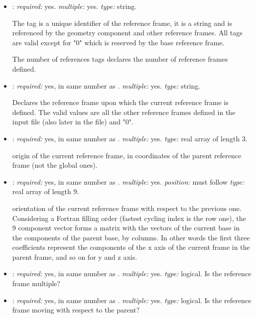 \begin{itemize}
\item {}: \textit{required:} yes. \textit{multiple:} yes. 
\textit{type:} string.

The tag is a unique identifier of the reference frame, it is a string and is 
referenced by the geometry component and other reference frames. All tags are 
valid except for "0" which is reserved by the base reference frame. 

The number of references tags declares the number of reference frames defined.

\item {}: \textit{required:} yes, in same number as . 
\textit{multiple:} yes. \textit{type:} string.

Declares the reference frame upon which the current reference frame is defined. 
The valid values are all the other reference frames defined in the input file 
(also later in the file) and "0". 

\item {}: \textit{required:} yes, in same number as . 
\textit{multiple:} yes. \textit{type:} real array of length 3.

origin of the current reference frame, in coordinates of the parent reference frame 
(not the global ones). 

\item {}: \textit{required:} yes, in same number as . 
\textit{multiple:} yes. \textit{position:} must follow  
\textit{type:} real array of length 9.

orientation of the current reference frame with respect to the previous one. 
Considering a Fortran filling order (fastest cycling index is the row one), 
the 9 component vector forms a matrix with the vectors of the current base 
in the components of the parent base, by columns. In other words the first 
three coefficients represent the components of the x axis of the current frame 
in the parent frame, and so on for y and z axis. 

\item {}: \textit{required:} yes, in same number as . 
\textit{multiple:} yes. \textit{type:} logical.
Is the reference frame multiple? 

\item {}: \textit{required:} yes, in same number as . 
\textit{multiple:} yes. \textit{type:} logical.
Is the reference frame moving with respect to the parent? 
\end{itemize}

